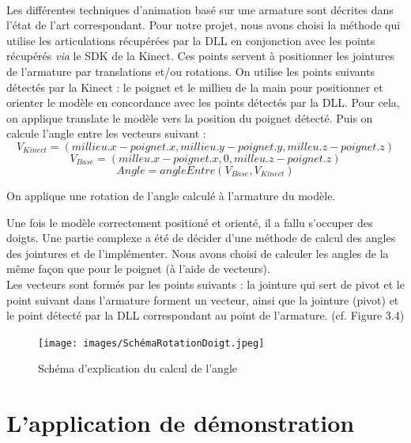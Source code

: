\paragraph{}
Les différentes techniques d'animation basé sur une armature sont décrites dans l'état de l'art correspondant. 
Pour notre projet, nous avons choisi la méthode qui utilise les articulations récupérées par la DLL en conjonction avec les points récupérés \textit{via} le SDK de la Kinect. 
Ces points servent à positionner les jointures de l'armature par translations et/ou rotations.\newline
On utilise les points suivants détectés par la Kinect : le poignet et le millieu de la main pour positionner et orienter le modèle en concordance avec les points détectés par la DLL.
Pour cela, on applique translate le modèle vers la position du poignet détecté. Puis on calcule l'angle entre les vecteurs suivant : 
$$
V_{Kinect} = (millieu.x - poignet.x, millieu.y - poignet.y, milleu.z - poignet.z)
$$
$$
V_{Base}   = (milleu.x - poignet.x, 0, milleu.z - poignet.z)
$$
$$
Angle = angleEntre(V_{Base}, V_{Kinect})
$$

On applique une rotation de l'angle calculé à l'armature du modèle.\newline

Une fois le modèle correctement positioné et orienté, il a fallu s'occuper des doigts. Une partie complexe a été de décider d'une méthode de calcul des angles des jointures et de l'implémenter.
Nous avons choisi de calculer les angles de la même façon que pour le poignet (à l'aide de vecteurs).\\
Les vecteurs sont formés par les points suivants : la jointure qui sert de pivot et le point suivant dans l'armature forment un vecteur, ainsi que la jointure (pivot) et le point détecté par la DLL correspondant au point de l'armature. (cf. Figure 3.4)

\begin{figure}[!h]
 \centering
 \texttt{[image: images/SchémaRotationDoigt.jpeg]}
 \caption{Schéma d'explication du calcul de l'angle}
\end{figure}

\section{L'application de démonstration}